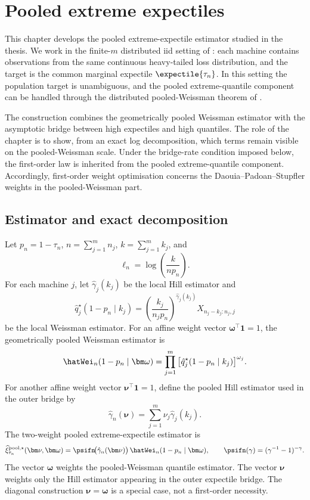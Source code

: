 \chapter{Pooled extreme expectiles}
\label{ch:pooled-extreme}

This chapter develops the pooled extreme-expectile estimator studied in the
thesis. We work in the finite-\(m\) distributed iid setting of
: each machine contains observations from the same
continuous heavy-tailed loss distribution, and the target is the common
marginal expectile \(\expectile{\tau_n}\). In this setting the population
target is unambiguous, and the pooled extreme-quantile component can be
handled through the distributed pooled-Weissman theorem of
\textcite[Corollary~8]{DaouiaPadoanStupfler2021}.

The construction combines the geometrically pooled Weissman estimator with the
asymptotic bridge between high expectiles and high quantiles. The role of the
chapter is to show, from an exact log decomposition, which terms remain visible
on the pooled-Weissman scale. Under the bridge-rate condition imposed below,
the first-order law is inherited from the pooled extreme-quantile component.
Accordingly, first-order weight optimisation concerns the
Daouia--Padoan--Stupfler weights in the pooled-Weissman part.

\section{Estimator and exact decomposition}
\label{sec:pool-ext:estimator}

Let \(p_n=1-\tau_n\), \(n=\sum_{j=1}^{m}n_j\), \(k=\sum_{j=1}^{m}k_j\), and
\[
  \ell_n=\log\!\left(\frac{k}{np_n}\right).
\]
For each machine \(j\), let \(\hat\gamma_j(k_j)\) be the local Hill estimator
and
\[
  \hat q_j^\star(1-p_n\mid k_j)
  =
  \left(\frac{k_j}{n_jp_n}\right)^{\hat\gamma_j(k_j)}
  X_{n_j-k_j:n_j,j}
\]
be the local Weissman estimator. For an affine weight vector
\(\bm\omega^\top\bm 1=1\), the geometrically pooled Weissman estimator is
\[
  \hatWei_n(1-p_n\mid\bm\omega)
  =
  \prod_{j=1}^{m}
  \big[\hat q_j^\star(1-p_n\mid k_j)\big]^{\omega_j}.
\]
For another affine weight vector \(\bm\nu^\top\bm 1=1\), define the pooled
Hill estimator used in the outer bridge by
\[
  \hat\gamma_n(\bm\nu)
  =
  \sum_{j=1}^{m}\nu_j\hat\gamma_j(k_j).
\]
The two-weight pooled extreme-expectile estimator is
\begin{equation}
\label{eq:pool-ext:estimator}
  \widehat\xi_{\tau_n}^{\mathrm{pool},\star}(\bm\nu,\bm\omega)
  =
  \psifn\!\big(\hat\gamma_n(\bm\nu)\big)\,
  \hatWei_n(1-p_n\mid\bm\omega),
  \qquad
  \psifn(\gamma)=(\gamma^{-1}-1)^{-\gamma}.
\end{equation}
The vector \(\bm\omega\) weights the pooled-Weissman quantile estimator. The
vector \(\bm\nu\) weights only the Hill estimator appearing in the outer
expectile bridge. The diagonal construction
\(\bm\nu=\bm\omega\) is a special case, not a first-order necessity.


